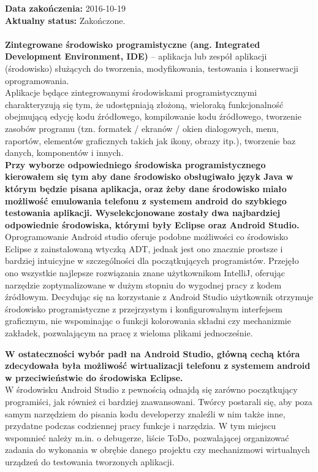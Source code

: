 \noindent\textbf{Data zakończenia:} 2016-10-19\\

\noindent\textbf{Aktualny status:} Zakończone.\\
\\

\textbf{Zintegrowane środowisko programistyczne (ang. Integrated Development Environment, IDE)} – aplikacja lub zespół aplikacji (środowisko) służących do tworzenia, modyfikowania, testowania i konserwacji oprogramowania.
\\

Aplikacje będące zintegrowanymi środowiskami programistycznymi charakteryzują się tym, że udostępniają złożoną, wieloraką funkcjonalność obejmującą edycję kodu źródłowego, kompilowanie kodu źródłowego, tworzenie zasobów programu (tzn. formatek / ekranów / okien dialogowych, menu, raportów, elementów graficznych takich jak ikony, obrazy itp.), tworzenie baz danych, komponentów i innych.
\\

\textbf{Przy wyborze odpowiedniego środowiska programistycznego kierowałem się tym aby dane środowisko obsługiwało język Java w którym będzie pisana aplikacja, oraz żeby dane środowisko miało możliwość emulowania telefonu z systemem android do szybkiego testowania aplikacji. Wyselekcjonowane zostały dwa  najbardziej odpowiednie środowiska, którymi były Eclipse oraz Android Studio.}
\\

Oprogramowanie Android studio oferuje podobne możliwości co środowisko Eclipse z zainstalowaną wtyczką ADT, jednak jest ono znacznie prostsze i bardziej intuicyjne w szczególności dla początkujących programistów. Przejęło ono wszystkie najlepsze rozwiązania znane użytkownikom IntelliJ, oferując narzędzie zoptymalizowane w dużym stopniu do wygodnej pracy z kodem źródłowym. Decydując się na korzystanie z Android Studio użytkownik otrzymuje środowisko programistyczne z przejrzystym i konfigurowalnym interfejsem graficznym, nie wspominając o funkcji kolorowania składni czy mechanizmie zakładek, pozwalającym na pracę z wieloma plikami jednocześnie.

\textbf{W ostateczności wybór padł na Android Studio, główną cechą która zdecydowała była możliwość wirtualizacji telefonu z systemem android w przeciwieństwie do środowiska Eclipse.}
\\

W środowisku Android Studio z pewnością odnajdą się zarówno początkujący programiści, jak również ci bardziej zaawansowani. Twórcy postarali się, aby poza samym narzędziem do pisania kodu developerzy znaleźli w nim także inne, przydatne podczas codziennej pracy funkcje i narzędzia. W tym miejscu wspomnieć należy m.in. o debugerze, liście ToDo, pozwalającej organizować zadania do wykonania w obrębie danego projektu czy mechanizmowi wirtualnych urządzeń do testowania tworzonych aplikacji.




